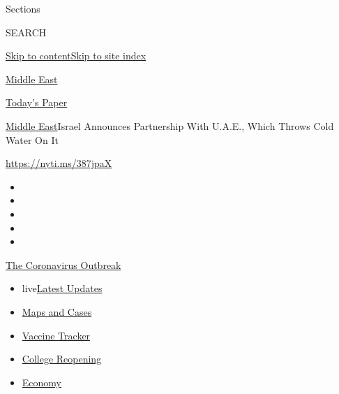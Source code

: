 Sections

SEARCH

\protect\hyperlink{site-content}{Skip to
content}\protect\hyperlink{site-index}{Skip to site index}

\href{https://www.nytimes.com/section/world/middleeast}{Middle East}

\href{https://myaccount.nytimes.com/auth/login?response_type=cookie\&client_id=vi}{}

\href{https://www.nytimes.com/section/todayspaper}{Today's Paper}

\href{/section/world/middleeast}{Middle East}\textbar{}Israel Announces
Partnership With U.A.E., Which Throws Cold Water On It

\url{https://nyti.ms/387jpaX}

\begin{itemize}
\item
\item
\item
\item
\item
\end{itemize}

\href{https://www.nytimes.com/news-event/coronavirus?action=click\&pgtype=Article\&state=default\&region=TOP_BANNER\&context=storylines_menu}{The
Coronavirus Outbreak}

\begin{itemize}
\tightlist
\item
  live\href{https://www.nytimes.com/2020/08/04/world/coronavirus-covid-19.html?action=click\&pgtype=Article\&state=default\&region=TOP_BANNER\&context=storylines_menu}{Latest
  Updates}
\item
  \href{https://www.nytimes.com/interactive/2020/us/coronavirus-us-cases.html?action=click\&pgtype=Article\&state=default\&region=TOP_BANNER\&context=storylines_menu}{Maps
  and Cases}
\item
  \href{https://www.nytimes.com/interactive/2020/science/coronavirus-vaccine-tracker.html?action=click\&pgtype=Article\&state=default\&region=TOP_BANNER\&context=storylines_menu}{Vaccine
  Tracker}
\item
  \href{https://www.nytimes.com/2020/08/02/us/covid-college-reopening.html?action=click\&pgtype=Article\&state=default\&region=TOP_BANNER\&context=storylines_menu}{College
  Reopening}
\item
  \href{https://www.nytimes.com/live/2020/08/04/business/stock-market-today-coronavirus?action=click\&pgtype=Article\&state=default\&region=TOP_BANNER\&context=storylines_menu}{Economy}
\end{itemize}

